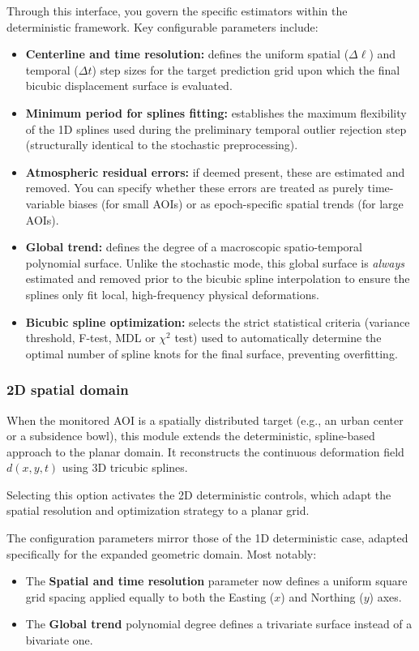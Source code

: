 Through this interface, you govern the specific estimators within the deterministic framework. Key configurable parameters include:
\begin{itemize}
    \item \textbf{Centerline and time resolution:} defines the uniform spatial ($\Delta \ell$) and temporal ($\Delta t$) step sizes for the target prediction grid upon which the final bicubic displacement surface is evaluated.
    \item \textbf{Minimum period for splines fitting:} establishes the maximum flexibility of the 1D splines used during the preliminary temporal outlier rejection step (structurally identical to the stochastic preprocessing).
    \item \textbf{Atmospheric residual errors:} if deemed present, these are estimated and removed. You can specify whether these errors are treated as purely time-variable biases (for small AOIs) or as epoch-specific spatial trends (for large AOIs).
    \item \textbf{Global trend:} defines the degree of a macroscopic spatio-temporal polynomial surface. Unlike the stochastic mode, this global surface is \textit{always} estimated and removed prior to the bicubic spline interpolation to ensure the splines only fit local, high-frequency physical deformations.
    \item \textbf{Bicubic spline optimization:} selects the strict statistical criteria (variance threshold, F-test, MDL or $\chi^2$ test) used to automatically determine the optimal number of spline knots for the final surface, preventing overfitting.
\end{itemize}

\subsubsection{2D spatial domain}
When the monitored AOI is a spatially distributed target (e.g., an urban center or a subsidence bowl), this module extends the deterministic, spline-based approach to the planar domain. It reconstructs the continuous deformation field $d(x,y,t)$ using 3D tricubic splines.

Selecting this option activates the 2D deterministic controls, which adapt the spatial resolution and optimization strategy to a planar grid.

The configuration parameters mirror those of the 1D deterministic case, adapted specifically for the expanded geometric domain. Most notably:
\begin{itemize}
    \item The \textbf{Spatial and time resolution} parameter now defines a uniform square grid spacing applied equally to both the Easting ($x$) and Northing ($y$) axes.
    \item The \textbf{Global trend} polynomial degree defines a trivariate surface instead of a bivariate one.
\end{itemize}


